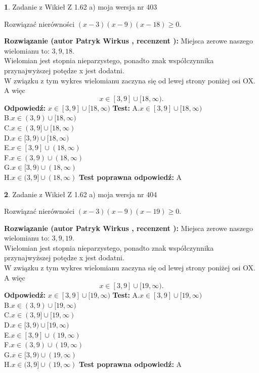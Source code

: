 \documentclass[12pt, a4paper]{article}
\theoremstyle{definition} %
\newtheorem{zad}{}
\newcommand{\zadStart}[1]{\begin{zad}#1\newline}
\newcommand{\zadStop}{\end{zad}}
\newcommand{\rozwStart}[2]{\noindent \textbf{Rozwiązanie (autor #1 , recenzent #2): }\newline}
\newcommand{\rozwStop}{\newline}
\newcommand{\odpStart}{\noindent \textbf{Odpowiedź:}\newline}
\newcommand{\odpStop}{\newline}
\newcommand{\testStart}{\noindent \textbf{Test:}\newline}
\newcommand{\testStop}{\newline}
\newcommand{\kluczStart}{\noindent \textbf{Test poprawna odpowiedź:}\newline}
\newcommand{\kluczStop}{\newline}
\begin{document}
\zadStart{Zadanie z Wikieł Z 1.62 a) moja wersja nr 403}

Rozwiązać nierówności $(x-3)(x-9)(x-18)\ge0$.
\zadStop
\rozwStart{Patryk Wirkus}{}
Miejsca zerowe naszego wielomianu to: $3, 9, 18$.\\
Wielomian jest stopnia nieparzystego, ponadto znak współczynnika przy\linebreak najwyższej potędze x jest dodatni.\\ W związku z tym wykres wielomianu zaczyna się od lewej strony poniżej osi OX. A więc $$x \in [3,9] \cup [18,\infty).$$
\rozwStop
\odpStart
$x \in [3,9] \cup [18,\infty)$
\odpStop
\testStart
A.$x \in [3,9] \cup [18,\infty)$\\
B.$x \in (3,9) \cup [18,\infty)$\\
C.$x \in (3,9] \cup [18,\infty)$\\
D.$x \in [3,9) \cup [18,\infty)$\\
E.$x \in [3,9] \cup (18,\infty)$\\
F.$x \in (3,9) \cup (18,\infty)$\\
G.$x \in [3,9) \cup (18,\infty)$\\
H.$x \in (3,9] \cup (18,\infty)$
\testStop
\kluczStart
A
\kluczStop



\zadStart{Zadanie z Wikieł Z 1.62 a) moja wersja nr 404}

Rozwiązać nierówności $(x-3)(x-9)(x-19)\ge0$.
\zadStop
\rozwStart{Patryk Wirkus}{}
Miejsca zerowe naszego wielomianu to: $3, 9, 19$.\\
Wielomian jest stopnia nieparzystego, ponadto znak współczynnika przy\linebreak najwyższej potędze x jest dodatni.\\ W związku z tym wykres wielomianu zaczyna się od lewej strony poniżej osi OX. A więc $$x \in [3,9] \cup [19,\infty).$$
\rozwStop
\odpStart
$x \in [3,9] \cup [19,\infty)$
\odpStop
\testStart
A.$x \in [3,9] \cup [19,\infty)$\\
B.$x \in (3,9) \cup [19,\infty)$\\
C.$x \in (3,9] \cup [19,\infty)$\\
D.$x \in [3,9) \cup [19,\infty)$\\
E.$x \in [3,9] \cup (19,\infty)$\\
F.$x \in (3,9) \cup (19,\infty)$\\
G.$x \in [3,9) \cup (19,\infty)$\\
H.$x \in (3,9] \cup (19,\infty)$
\testStop
\kluczStart
A
\kluczStop
\end{document}
